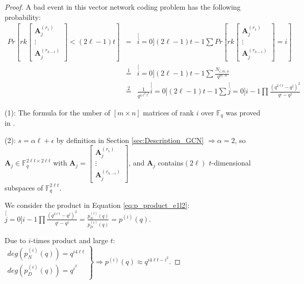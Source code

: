\begin{proof}
A bad event in this vector network coding problem has the following
probability:
\begin{eqnarray}
Pr\left[rk\left[\begin{array}{c}
\boldsymbol{A}_{j}^{\left(r_{1}\right)}\\
\vdots\\
\boldsymbol{A}_{j}^{\left(r_{h-\epsilon}\right)}
\end{array}\right]<\left(2\ell-1\right)t\right] & = & \stackrel[i=0]{\left(2\ell-1\right)t-1}{\mathop{\sum}}Pr\left[rk\left[\begin{array}{c}
\boldsymbol{A}_{j}^{\left(r_{1}\right)}\\
\vdots\\
\boldsymbol{A}_{j}^{\left(r_{h-\epsilon}\right)}
\end{array}\right]=i\right]\nonumber \\
 & \overset{1}{=} & \stackrel[i=0]{\left(2\ell-1\right)t-1}{\mathop{\sum}}\frac{N_{i,m,n}}{q^{m\cdot n}}\nonumber \\
 & \overset{2}{=} & \frac{1}{q^{4\ell^{2}t^{2}}}\stackrel[i=0]{\left(2\ell-1\right)t-1}{\mathop{\sum}}\stackrel[j=0]{i-1}{\mathop{\prod}}\frac{\left(q^{2\ell t}-q^{j}\right)^{2}}{q^{i}-q^{j}}\label{eq:p_product_e1l2}
\end{eqnarray}

(1): The formula for the umber of $\left[m\times n\right]$ matrices
of rank $i$ over $\ensuremath{\mathbb{F}}_{q}$ was proved in \cite{Overbeck:2007}.

(2): $s=\alpha\ell+\epsilon$ by definition in Section \ref{sec:Description_GCN}
$\Rightarrow\alpha=2$, so $\boldsymbol{A}_{j}\in\ensuremath{\mathbb{F}}_{q}^{2\ell t\times2\ell t}$
with $\boldsymbol{A}_{j}=\left[\begin{array}{c}
\boldsymbol{A}_{j}^{\left(r_{1}\right)}\\
\vdots\\
\boldsymbol{A}_{j}^{\left(r_{h-\epsilon}\right)}
\end{array}\right]$, and $\boldsymbol{A}_{j}$ contains$\left(2\ell\right)$ $t$-dimensional
subspaces of $\ensuremath{\mathbb{F}}_{q}^{2\ell t}$.

We consider the product in Equation \ref{eq:p_product_e1l2}: $\stackrel[j=0]{i-1}{\mathop{\prod}}\frac{\left(q^{2\ell t}-q^{j}\right)^{2}}{q^{i}-q^{j}}=\frac{p_{N}^{(i)}(q)}{p_{D}^{(i)}(q)}=p^{(i)}(q)$.

Due to $i$-times product and large $t$: $\left.\begin{array}{c}
deg\left(p_{N}^{(i)}(q)\right)=q^{i4\ell t}\\
deg\left(p_{D}^{(i)}(q)\right)=q^{i^{2}}
\end{array}\right\} \Rightarrow p^{(i)}(q)\approx q^{i4\ell t-i^{2}}$.


\end{proof}
